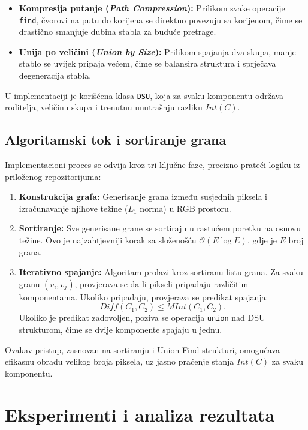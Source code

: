 \documentclass[11pt,a4paper]{article}
\begin{document}
\begin{itemize}
    \item \textbf{Kompresija putanje (\textit{Path Compression}):} Prilikom svake operacije \texttt{find}, čvorovi na putu do korijena se direktno povezuju sa korijenom, čime se drastično smanjuje dubina stabla za buduće pretrage.
    \item \textbf{Unija po veličini (\textit{Union by Size}):} Prilikom spajanja dva skupa, manje stablo se uvijek pripaja većem, čime se balansira struktura i sprječava degeneracija stabla.
\end{itemize}

U implementaciji je korišćena klasa \texttt{DSU}, koja za svaku komponentu održava roditelja, veličinu skupa i trenutnu unutrašnju razliku $Int(C)$.

\subsection{Algoritamski tok i sortiranje grana}
Implementacioni proces se odvija kroz tri ključne faze, precizno prateći logiku iz priloženog repozitorijuma:

\begin{enumerate}
    \item \textbf{Konstrukcija grafa:} Generisanje grana između susjednih piksela i izračunavanje njihove težine ($L_1$ norma) u RGB prostoru.
    \item \textbf{Sortiranje:} Sve generisane grane se sortiraju u rastućem poretku na osnovu težine. Ovo je najzahtjevniji korak sa složenošću $\mathcal{O}(E \log E)$, gdje je $E$ broj grana.
    \item \textbf{Iterativno spajanje:} Algoritam prolazi kroz sortiranu listu grana. Za svaku granu $(v_i, v_j)$, provjerava se da li pikseli pripadaju različitim komponentama. Ukoliko pripadaju, provjerava se predikat spajanja:
    \begin{equation}
        Diff(C_1, C_2) \le MInt(C_1, C_2).
    \end{equation}
    Ukoliko je predikat zadovoljen, poziva se operacija \texttt{union} nad DSU strukturom, čime se dvije komponente spajaju u jednu.
\end{enumerate}

Ovakav pristup, zasnovan na sortiranju i Union-Find strukturi, omogućava efikasnu obradu velikog broja piksela, uz jasno praćenje stanja $Int(C)$ za svaku komponentu.

\section{Eksperimenti i analiza rezultata}
\end{document}
